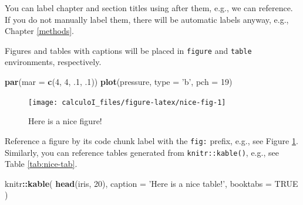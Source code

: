 \documentclass[]{krantz}
\newenvironment{Shaded}{\begin{snugshade}}{\end{snugshade}}
\newcommand{\DataTypeTok}[1]{\textcolor[rgb]{0.27,0.27,0.27}{#1}}
\newcommand{\DecValTok}[1]{\textcolor[rgb]{0.06,0.06,0.06}{#1}}
\newcommand{\FloatTok}[1]{\textcolor[rgb]{0.06,0.06,0.06}{#1}}
\newcommand{\KeywordTok}[1]{\textcolor[rgb]{0.27,0.27,0.27}{\textbf{#1}}}
\newcommand{\NormalTok}[1]{#1}
\newcommand{\OperatorTok}[1]{\textcolor[rgb]{0.43,0.43,0.43}{\textbf{#1}}}
\newcommand{\OtherTok}[1]{\textcolor[rgb]{0.37,0.37,0.37}{#1}}
\newcommand{\StringTok}[1]{\textcolor[rgb]{0.5,0.5,0.5}{#1}}
\begin{document}
You can label chapter and section titles using after them, e.g., we can reference. If you do not manually label them, there will be automatic labels anyway, e.g., Chapter \ref{methods}.

Figures and tables with captions will be placed in \texttt{figure} and \texttt{table} environments, respectively.

\begin{Shaded}
\begin{Highlighting}[]
\KeywordTok{par}\NormalTok{(}\DataTypeTok{mar =} \KeywordTok{c}\NormalTok{(}\DecValTok{4}\NormalTok{, }\DecValTok{4}\NormalTok{, }\FloatTok{.1}\NormalTok{, }\FloatTok{.1}\NormalTok{))}
\KeywordTok{plot}\NormalTok{(pressure, }\DataTypeTok{type =} \StringTok{'b'}\NormalTok{, }\DataTypeTok{pch =} \DecValTok{19}\NormalTok{)}
\end{Highlighting}
\end{Shaded}

\begin{figure}

{\centering \texttt{[image: calculoI\_files/figure-latex/nice-fig-1]} 

}

\caption{Here is a nice figure!}\label{fig:nice-fig}
\end{figure}

Reference a figure by its code chunk label with the \texttt{fig:} prefix, e.g., see Figure \ref{fig:nice-fig}. Similarly, you can reference tables generated from \texttt{knitr::kable()}, e.g., see Table \ref{tab:nice-tab}.

\begin{Shaded}
\begin{Highlighting}[]
\NormalTok{knitr}\OperatorTok{::}\KeywordTok{kable}\NormalTok{(}
  \KeywordTok{head}\NormalTok{(iris, }\DecValTok{20}\NormalTok{), }\DataTypeTok{caption =} \StringTok{'Here is a nice table!'}\NormalTok{,}
  \DataTypeTok{booktabs =} \OtherTok{TRUE}
\NormalTok{)}
\end{Highlighting}
\end{Shaded}
\end{document}
